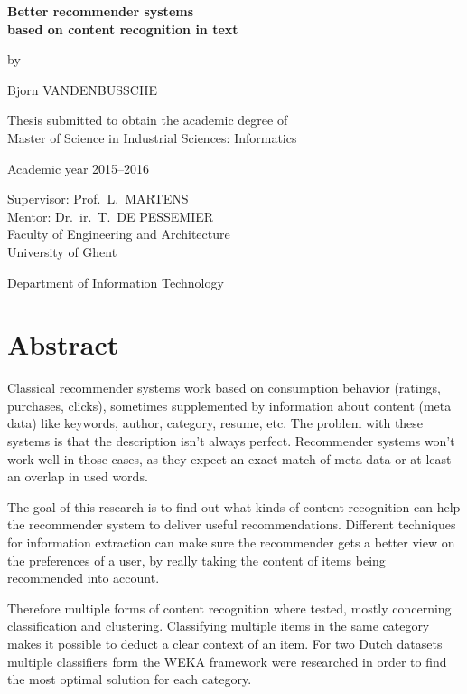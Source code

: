 {
\setlength{\baselineskip}{14pt}
\setlength{\parindent}{0pt}
\setlength{\parskip}{8pt}

\begin{center}

\noindent \textbf{\huge
Better recommender systems\\[8pt]based on content recognition in text
}

by 

Bjorn VANDENBUSSCHE

Thesis submitted to obtain the academic degree of\\
Master of Science in Industrial Sciences: Informatics

Academic year 2015--2016

Supervisor: Prof.~L.~MARTENS\\
Mentor: Dr.~ir.~T.~DE PESSEMIER\\

Faculty of Engineering and Architecture\\
University of Ghent

Department of Information Technology

\end{center}

\section*{Abstract}

Classical recommender systems work based on consumption behavior (ratings, purchases, clicks), sometimes supplemented by information about content (meta data) like keywords, author, category, resume, etc. The problem with these systems is that the description isn't always perfect. Recommender systems won't work well in those cases, as they expect an exact match of meta data or at least an overlap in used words.

The goal of this research is to find out what kinds of content recognition can help the recommender system to deliver useful recommendations. Different techniques for information extraction can make sure the recommender gets a better view on the preferences of a user, by really taking the content of items being recommended into account.

Therefore multiple forms of content recognition where tested, mostly concerning classification and clustering. Classifying multiple items in the same category makes it possible to deduct a clear context of an item. For two Dutch datasets multiple classifiers form the WEKA framework were researched in order to find the most optimal solution for each category. 

}
